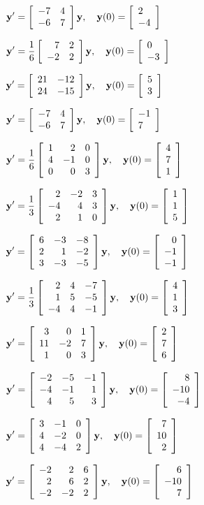 \begin{exerciselist}

  \item\label{exer:10.4.16} $\dst{{\bf y}'=\twobytwo{-7}4{-6}7{\bf y},\quad{\bf y}(0)=\twocol2{-4}}$

  \item\label{exer:10.4.17}
        $\dst{{\bf y}'=\frac{1}{6}\twobytwo72{-2}2{\bf y},\quad{\bf y}(0)=\twocol0{-3}}$

  \item\label{exer:10.4.18}
        $\dst{{\bf y}'=\twobytwo{21}{-12}{24}{-15}{\bf y},\quad{\bf y}(0)=\twocol53}$

  \item\label{exer:10.4.19} $\dst{{\bf y}'=\twobytwo{-7}4{-6}7{\bf y},\quad{\bf y}(0)=\twocol{-1}7}$

  \item\label{exer:10.4.20}
        $\dst{{\bf y}'=\frac{1}{6}\threebythree1204{-1}0003{\bf y},\quad{\bf y}(0)=\threecol471}$

  \item\label{exer:10.4.21}
        $\dst{{\bf y}'=\frac{1}{3}\threebythree2{-2}3{-4}43210{\bf y},\quad{\bf y}(0)=\threecol115}$

  \item\label{exer:10.4.22}
        $\dst{{\bf y}'=\threebythree6{-3}{-8}21{-2}3{-3}{-5}{\bf y},\quad{\bf y}(0)=\threecol0{-1}{-1}}$

  \item\label{exer:10.4.23}
        $\dst{{\bf y}'=\frac{1}{3}\threebythree24{-7}15{-5}{-4}4{-1}{\bf y},\quad{\bf y}(0)=\threecol413}$

  \item\label{exer:10.4.24}
        $\dst{ {\bf y}'=\threebythree301{11}{-2}7103{\bf y},\quad {\bf y}(0)=\threecol276}$

  \item\label{exer:10.4.25}
        $\dst{ {\bf y}'=\threebythree{-2}{-5}{-1}{-4}{-1}145{3}{\bf y},\quad {\bf y}(0)=\threecol8{-10}{-4}}$

  \item\label{exer:10.4.26}
        $\dst{ {\bf y}'=\threebythree3{-1}04{-2}04{-4}2{\bf y},\quad {\bf y}(0)=\threecol7{10}2}$

  \item\label{exer:10.4.27} $\dst{{\bf y}'= \left[\begin{array}{rrr}-2&2&6\\2&6&2\\-2&-2& 2\end{array}\right]{\bf y}},\quad{\bf y}(0)=\threecol6{-10}7$


\end{exerciselist}
